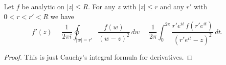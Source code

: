 \begin{lemma}
\label{cauchy_formula_deriv}
\leanok
Let $f$ be analytic on $|z|\leq R$. For any $z$ with $|z|\leq r$ and any $r'$
    with $0 < r < r' < R$ we have
    $$f'(z)=\frac{1}{2\pi i}\oint_{|w|=r'}\frac{f(w)}{(w-z)^2}\,dw=\frac{1}{2\pi}
    \int_0^{2\pi}\frac{r'e^{it}\,f(r'e^{it})}{(r'e^{it}-z)^2}\,dt.$$
\end{lemma}
\begin{proof}
\leanok
This is just Cauchy's integral formula for derivatives.
\end{proof}
